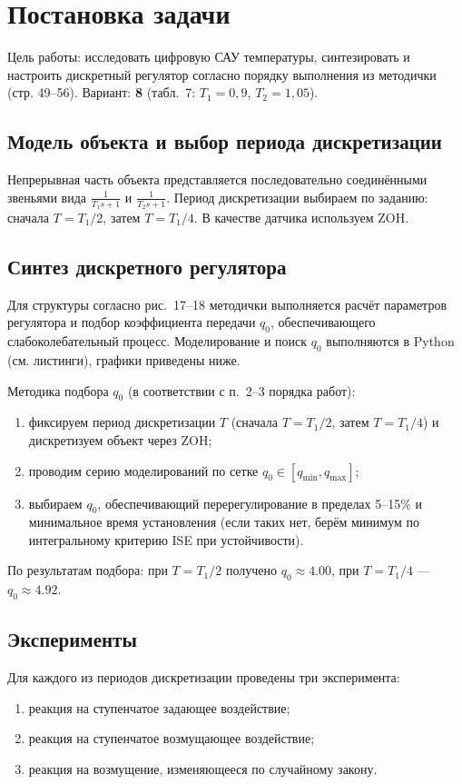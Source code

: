
\chapter{Постановка задачи}
Цель работы: исследовать цифровую САУ температуры, синтезировать и настроить дискретный регулятор согласно порядку выполнения из методички (стр. 49–56). Вариант: \textbf{8} (табл.~7: $T_1=0{,}9$, $T_2=1{,}05$).

\section{Модель объекта и выбор периода дискретизации}
Непрерывная часть объекта представляется последовательно соединёнными звеньями вида $\frac{1}{T_1 s + 1}$ и $\frac{1}{T_2 s + 1}$.
Период дискретизации выбираем по заданию: сначала $T = T_1/2$, затем $T=T_1/4$. В качестве датчика используем ZOH.

\section{Синтез дискретного регулятора}
Для структуры согласно рис.~17–18 методички выполняется расчёт параметров регулятора и подбор коэффициента передачи $q_0$, обеспечивающего слабоколебательный процесс. Моделирование и поиск $q_0$ выполняются в Python (см. листинги), графики приведены ниже.

Методика подбора $q_0$ (в соответствии с п.~2–3 порядка работ):
\begin{enumerate}
    \item фиксируем период дискретизации $T$ (сначала $T=T_1/2$, затем $T=T_1/4$) и дискретизуем объект через ZOH;
    \item проводим серию моделирований по сетке $q_0\in[q_{\min}, q_{\max}]$;
    \item выбираем $q_0$, обеспечивающий перерегулирование в пределах 5–15\% и минимальное время установления (если таких нет, берём минимум по интегральному критерию ISE при устойчивости).
\end{enumerate}
По результатам подбора: при $T=T_1/2$ получено $q_0\approx4.00$, при $T=T_1/4$ — $q_0\approx4.92$.

\section{Эксперименты}
Для каждого из периодов дискретизации проведены три эксперимента:
\begin{enumerate}
    \item реакция на ступенчатое задающее воздействие;
    \item реакция на ступенчатое возмущающее воздействие;
    \item реакция на возмущение, изменяющееся по случайному закону.
\end{enumerate}

